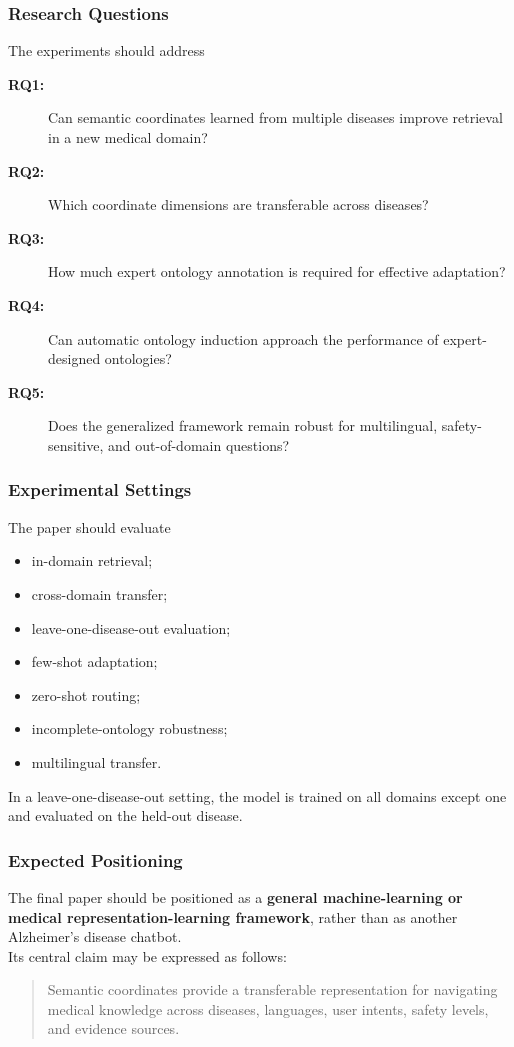 \documentclass{article}
\begin{document}
\subsubsection{Research Questions}

The experiments should address
\begin{description}
    \item[\textbf{RQ1:}]
    Can semantic coordinates learned from multiple diseases improve retrieval in a new medical domain?

    \item[\textbf{RQ2:}]
    Which coordinate dimensions are transferable across diseases?

    \item[\textbf{RQ3:}]
    How much expert ontology annotation is required for effective adaptation?

    \item[\textbf{RQ4:}]
    Can automatic ontology induction approach the performance of expert-designed ontologies?

    \item[\textbf{RQ5:}]
    Does the generalized framework remain robust for multilingual, safety-sensitive, and out-of-domain questions?
\end{description}

\subsubsection{Experimental Settings}

The paper should evaluate
\begin{itemize}
    \item in-domain retrieval;
    \item cross-domain transfer;
    \item leave-one-disease-out evaluation;
    \item few-shot adaptation;
    \item zero-shot routing;
    \item incomplete-ontology robustness;
    \item multilingual transfer.
\end{itemize}
In a leave-one-disease-out setting, the model is trained on all domains except
one and evaluated on the held-out disease.

\subsubsection{Expected Positioning}
The final paper should be positioned as a \textbf{general machine-learning or medical representation-learning framework}, rather than as another Alzheimer's disease chatbot.\\
Its central claim may be expressed as follows:
\begin{quote}
Semantic coordinates provide a transferable representation for navigating
medical knowledge across diseases, languages, user intents, safety levels,
and evidence sources.
\end{quote}
\end{document}
